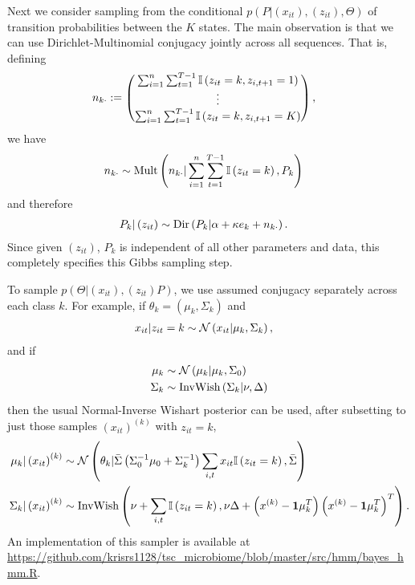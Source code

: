 \documentclass{article}
\begin{document}
Next we consider sampling from the conditional $p\left(P \vert
\left(x_{it}\right), \left(z_{it}\right), \Theta\right)$ of transition
probabilities between the $K$ states. The main observation is that we can use
Dirichlet-Multinomial conjugacy jointly across all sequences. That is, defining
\begin{align*}
 n_{k \cdot} &:= \begin{pmatrix} \sum_{i = 1}^{n} \sum_{t = 1}^{T - 1} \mathbb{I}\left({z_{it} = k, z_{i,t + 1} = 1}\right) \\ \vdots \\ \sum_{i = 1}^{n} \sum_{t = 1}^{T - 1} \mathbb{I}\left({z_{it} = k, z_{i,t + 1} = K}\right) \end{pmatrix},
\end{align*}
we have
\begin{align*}
n_{k\cdot} &\sim \textnormal{Mult}\left(n_{k\cdot} \vert \sum_{i = 1}^{n} \sum_{t = 1}^{T - 1} \mathbb{I}\left({z_{it} = k}\right), P_{k}\right)
\end{align*}
and therefore
\begin{align*}
  P_{k} \vert \left(z_{it}\right) &\sim \textnormal{Dir}\left(P_{k} \vert \alpha + \kappa e_{k} + n_{k\cdot}\right).
\end{align*}
Since given $\left(z_{it}\right)$, $P_{k}$ is independent of all other
parameters and data, this completely specifies this Gibbs sampling step.

To sample $p\left(\Theta \vert \left(x_{it}\right), \left(z_{it}\right)
P\right)$, we use assumed conjugacy separately across each class $k$. For
example, if $\theta_{k} = \left(\mu_{k}, \Sigma_{k}\right)$ and
\begin{align*}
  x_{it} \vert z_{it} = k &\sim \mathcal{N}\left(x_{it} \vert \mu_{k}, \Sigma_{k}\right),
\end{align*}
and if
\begin{align*}
  \mu_{k} &\sim \mathcal{N}\left(\mu_{k} \vert \mu_{k}, \Sigma_{0}\right) \\
  \Sigma_{k} &\sim \text{InvWish}\left(\Sigma_{k} \vert \nu, \Delta\right)
\end{align*}
then the usual Normal-Inverse Wishart posterior can be used, after subsetting to just those
samples $\left(x_{it}\right)^{(k)}$ with $z_{it} = k$,
\begin{align*}
  \mu_{k} \vert \left(x_{it}\right)^{(k)} &\sim \mathcal{N}\left(\theta_{k} \vert \bar{\Sigma}\left(\Sigma_0^{-1}\mu_{0} + \Sigma_{k}^{-1}\right) \sum_{i, t} x_{it}\mathbb{I}\left({z_{it} = k}\right), \bar{\Sigma}\right) \\
  \Sigma_{k} \vert \left(x_{it} \right)^{(k)} &\sim  \text{InvWish}\left(\nu + \sum_{i, t} \mathbb{I}\left({z_{it} = k}\right), \nu \Delta + \left(x^{(k)} - \mathbf{1} \mu_{k}^{T}\right)\left(x^{(k)} - \mathbf{1} \mu_{k}^{T}\right)^{T}\right).
\end{align*}
An implementation of this sampler is available at
\href{https://github.com/krisrs1128/tsc\_microbiome/blob/master/src/hmm/bayes\_hmm.R}{https://github.com/krisrs1128/tsc\_microbiome/blob/master/src/hmm/bayes\_hmm.R}.
\end{document}
